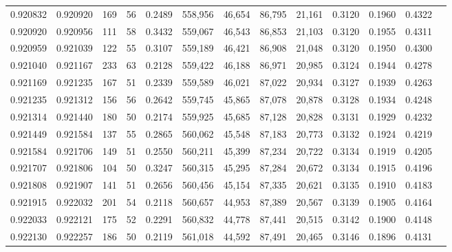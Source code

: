 \begin{tabular}{rrrrrrrrrrrrr}
0.920832 & 0.920920 &   169 &  56 &                                     0.2489 & 558,956 &  46,654 &  86,795 &  21,161 & 0.3120 & 0.1960 & 0.4322 \\
0.920920 & 0.920956 &   111 &  58 &                                     0.3432 & 559,067 &  46,543 &  86,853 &  21,103 & 0.3120 & 0.1955 & 0.4311 \\
0.920959 & 0.921039 &   122 &  55 &                                     0.3107 & 559,189 &  46,421 &  86,908 &  21,048 & 0.3120 & 0.1950 & 0.4300 \\
0.921040 & 0.921167 &   233 &  63 &                                     0.2128 & 559,422 &  46,188 &  86,971 &  20,985 & 0.3124 & 0.1944 & 0.4278 \\
0.921169 & 0.921235 &   167 &  51 &                                     0.2339 & 559,589 &  46,021 &  87,022 &  20,934 & 0.3127 & 0.1939 & 0.4263 \\
0.921235 & 0.921312 &   156 &  56 &                                     0.2642 & 559,745 &  45,865 &  87,078 &  20,878 & 0.3128 & 0.1934 & 0.4248 \\
0.921314 & 0.921440 &   180 &  50 &                                     0.2174 & 559,925 &  45,685 &  87,128 &  20,828 & 0.3131 & 0.1929 & 0.4232 \\
0.921449 & 0.921584 &   137 &  55 &                                     0.2865 & 560,062 &  45,548 &  87,183 &  20,773 & 0.3132 & 0.1924 & 0.4219 \\
0.921584 & 0.921706 &   149 &  51 &                                     0.2550 & 560,211 &  45,399 &  87,234 &  20,722 & 0.3134 & 0.1919 & 0.4205 \\
0.921707 & 0.921806 &   104 &  50 &                                     0.3247 & 560,315 &  45,295 &  87,284 &  20,672 & 0.3134 & 0.1915 & 0.4196 \\
0.921808 & 0.921907 &   141 &  51 &                                     0.2656 & 560,456 &  45,154 &  87,335 &  20,621 & 0.3135 & 0.1910 & 0.4183 \\
0.921915 & 0.922032 &   201 &  54 &                                     0.2118 & 560,657 &  44,953 &  87,389 &  20,567 & 0.3139 & 0.1905 & 0.4164 \\
0.922033 & 0.922121 &   175 &  52 &                                     0.2291 & 560,832 &  44,778 &  87,441 &  20,515 & 0.3142 & 0.1900 & 0.4148 \\
0.922130 & 0.922257 &   186 &  50 &                                     0.2119 & 561,018 &  44,592 &  87,491 &  20,465 & 0.3146 & 0.1896 & 0.4131 \\

\end{tabular}
